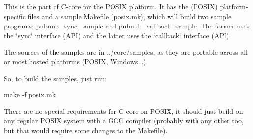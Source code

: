 This is the part of C-\/core for the P\-O\-S\-I\-X platform. It has the (P\-O\-S\-I\-X) platform-\/specific files and a sample Makefile ({\ttfamily posix.\-mk}), which will build two sample programs\-: {\ttfamily pubnub\-\_\-sync\-\_\-sample} and {\ttfamily pubnub\-\_\-callback\-\_\-sample}. The former uses the \char`\"{}sync\char`\"{} interface (A\-P\-I) and the latter uses the \char`\"{}callback\char`\"{} interface (A\-P\-I).

The sources of the samples are in {\ttfamily ../core/samples}, as they are portable across all or most hosted platforms (P\-O\-S\-I\-X, Windows...).

So, to build the samples, just run\-: \begin{DoxyVerb}make -f posix.mk
\end{DoxyVerb}


There are no special requirements for C-\/core on P\-O\-S\-I\-X, it should just build on any regular P\-O\-S\-I\-X system with a G\-C\-C compiler (probably with any other too, but that would require some changes to the Makefile). 